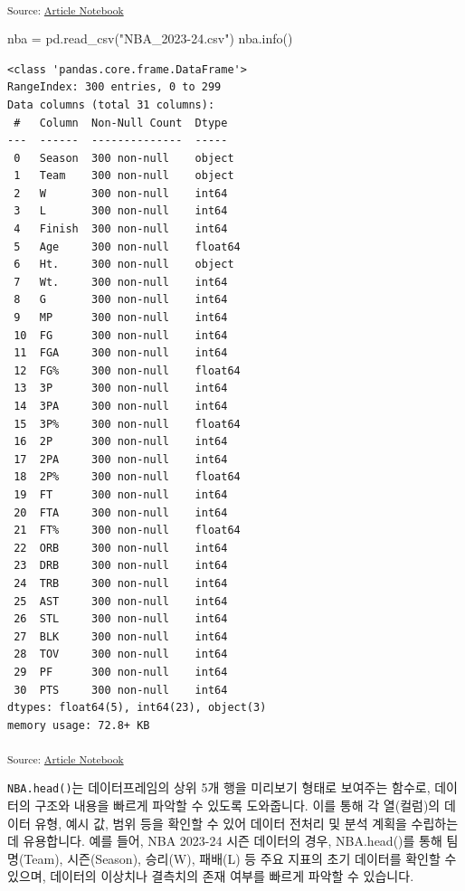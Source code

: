 \documentclass[
  a4paper,
  DIV=11,
  numbers=noendperiod]{scrreprt}
\newenvironment{Shaded}{\begin{snugshade}}{\end{snugshade}}
\newcommand{\NormalTok}[1]{\textcolor[rgb]{0.00,0.23,0.31}{#1}}
\newcommand{\OperatorTok}[1]{\textcolor[rgb]{0.37,0.37,0.37}{#1}}
\newcommand{\StringTok}[1]{\textcolor[rgb]{0.13,0.47,0.30}{#1}}
\begin{document}
\textsubscript{Source:
\href{https://sigmadream.github.io/practice-quarto/NBA_2023-24.ipynb.html}{Article
Notebook}}

\begin{Shaded}
\begin{Highlighting}[]
\NormalTok{nba }\OperatorTok{=}\NormalTok{ pd.read\_csv(}\StringTok{"NBA\_2023{-}24.csv"}\NormalTok{)}
\NormalTok{nba.info()}
\end{Highlighting}
\end{Shaded}

\begin{verbatim}
<class 'pandas.core.frame.DataFrame'>
RangeIndex: 300 entries, 0 to 299
Data columns (total 31 columns):
 #   Column  Non-Null Count  Dtype  
---  ------  --------------  -----  
 0   Season  300 non-null    object 
 1   Team    300 non-null    object 
 2   W       300 non-null    int64  
 3   L       300 non-null    int64  
 4   Finish  300 non-null    int64  
 5   Age     300 non-null    float64
 6   Ht.     300 non-null    object 
 7   Wt.     300 non-null    int64  
 8   G       300 non-null    int64  
 9   MP      300 non-null    int64  
 10  FG      300 non-null    int64  
 11  FGA     300 non-null    int64  
 12  FG%     300 non-null    float64
 13  3P      300 non-null    int64  
 14  3PA     300 non-null    int64  
 15  3P%     300 non-null    float64
 16  2P      300 non-null    int64  
 17  2PA     300 non-null    int64  
 18  2P%     300 non-null    float64
 19  FT      300 non-null    int64  
 20  FTA     300 non-null    int64  
 21  FT%     300 non-null    float64
 22  ORB     300 non-null    int64  
 23  DRB     300 non-null    int64  
 24  TRB     300 non-null    int64  
 25  AST     300 non-null    int64  
 26  STL     300 non-null    int64  
 27  BLK     300 non-null    int64  
 28  TOV     300 non-null    int64  
 29  PF      300 non-null    int64  
 30  PTS     300 non-null    int64  
dtypes: float64(5), int64(23), object(3)
memory usage: 72.8+ KB
\end{verbatim}

\textsubscript{Source:
\href{https://sigmadream.github.io/practice-quarto/NBA_2023-24.ipynb.html}{Article
Notebook}}

\texttt{NBA.head()}는 데이터프레임의 상위 5개 행을 미리보기 형태로
보여주는 함수로, 데이터의 구조와 내용을 빠르게 파악할 수 있도록
도와줍니다. 이를 통해 각 열(컬럼)의 데이터 유형, 예시 값, 범위 등을
확인할 수 있어 데이터 전처리 및 분석 계획을 수립하는 데 유용합니다. 예를
들어, NBA 2023-24 시즌 데이터의 경우, NBA.head()를 통해 팀명(Team),
시즌(Season), 승리(W), 패배(L) 등 주요 지표의 초기 데이터를 확인할 수
있으며, 데이터의 이상치나 결측치의 존재 여부를 빠르게 파악할 수
있습니다.
\end{document}
